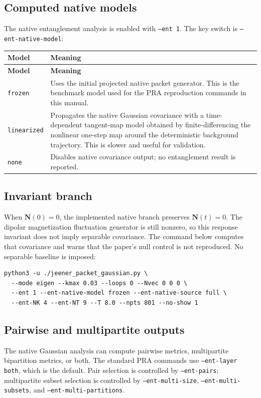 \documentclass[11pt]{article}
\begin{document}
\subsection{Computed native models}
The native entanglement analysis is enabled with \texttt{--ent 1}. The key switch
is \texttt{--ent-native-model}:
\begin{longtable}{L{0.24\textwidth}L{0.68\textwidth}}
\toprule
\textbf{Model} & \textbf{Meaning} \\
\midrule
\endfirsthead
\toprule
\textbf{Model} & \textbf{Meaning} \\
\midrule
\endhead
\texttt{frozen} & Uses the initial projected native packet generator. This is the benchmark model used for the PRA reproduction commands in this manual. \\
\texttt{linearized} & Propagates the native Gaussian covariance with a time-dependent tangent-map model obtained by finite-differencing the nonlinear one-step map around the deterministic background trajectory. This is slower and useful for validation. \\
\texttt{none} & Disables native covariance output; no entanglement result is reported. \\
\bottomrule
\end{longtable}

\subsection{Invariant branch}
When \(\mathbf N(0)=0\), the implemented native branch preserves
\(\mathbf N(t)=0\). The dipolar magnetization fluctuation generator is still
nonzero, so this response invariant does not imply separable covariance.
The command below computes that covariance and warns that the paper's null
control is not reproduced. No separable baseline is imposed:
\begin{lstlisting}[style=bashstyle]
python3 -u ./jeener_packet_gaussian.py \
  --mode eigen --kmax 0.03 --loops 0 --Nvec 0 0 0 \
  --ent 1 --ent-native-model frozen --ent-native-source full \
  --ent-NK 4 --ent-NT 9 --T 8.0 --npts 801 --no-show 1
\end{lstlisting}

\subsection{Pairwise and multipartite outputs}
The native Gaussian analysis can compute pairwise metrics, multipartite
bipartition metrics, or both. The standard PRA commands use
\texttt{--ent-layer both}, which is the default. Pair selection is controlled by
\texttt{--ent-pairs}; multipartite subset selection is controlled by
\texttt{--ent-multi-size}, \texttt{--ent-multi-subsets}, and
\texttt{--ent-multi-partitions}.
\end{document}

